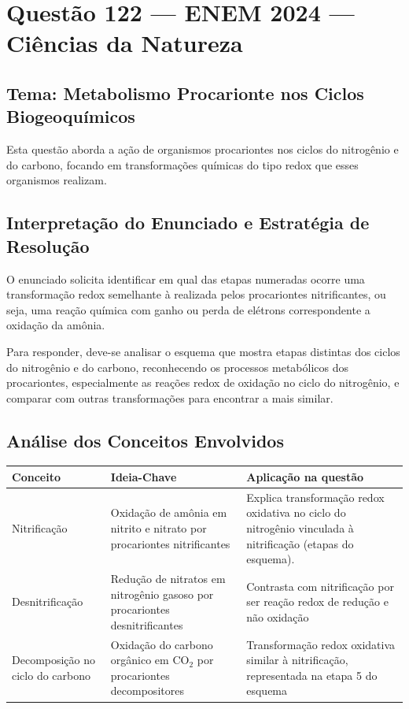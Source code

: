 \documentclass{article}
\begin{document}
\section*{Questão 122 — ENEM 2024 — Ciências da Natureza}

\subsection*{Tema: Metabolismo Procarionte nos Ciclos Biogeoquímicos}

Esta questão aborda a ação de organismos procariontes nos ciclos do nitrogênio e do carbono, focando em transformações químicas do tipo redox que esses organismos realizam.

\subsection*{Interpretação do Enunciado e Estratégia de Resolução}
O enunciado solicita identificar em qual das etapas numeradas ocorre uma transformação redox semelhante à realizada pelos procariontes nitrificantes, ou seja, uma reação química com ganho ou perda de elétrons correspondente a oxidação da amônia.

Para responder, deve-se analisar o esquema que mostra etapas distintas dos ciclos do nitrogênio e do carbono, reconhecendo os processos metabólicos dos procariontes, especialmente as reações redox de oxidação no ciclo do nitrogênio, e comparar com outras transformações para encontrar a mais similar.

\subsection*{Análise dos Conceitos Envolvidos}
\begin{tabular}{|p{4cm}|p{6cm}|p{6cm}|}
\hline
\textbf{Conceito} & \textbf{Ideia-Chave} & \textbf{Aplicação na questão} \\ \hline
Nitrificação & Oxidação de amônia em nitrito e nitrato por procariontes nitrificantes & Explica transformação redox oxidativa no ciclo do nitrogênio vinculada à nitrificação (etapas do esquema). \\ \hline
Desnitrificação & Redução de nitratos em nitrogênio gasoso por procariontes desnitrificantes & Contrasta com nitrificação por ser reação redox de redução e não oxidação \\ \hline
Decomposição no ciclo do carbono & Oxidação do carbono orgânico em CO$_2$ por procariontes decompositores & Transformação redox oxidativa similar à nitrificação, representada na etapa 5 do esquema \\ \hline
\end{tabular}
\end{document}
